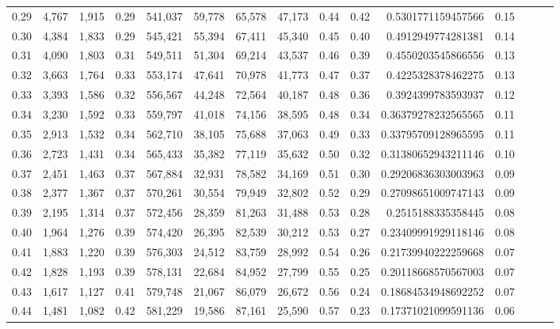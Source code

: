 \begin{tabular}{rrrrrrrrrrrrrrr}
0.29 &   4,767 &  1,915 &  0.29 &  541,037 &   59,778 &   65,578 &   47,173 &  0.44 &  0.42 &      0.5301771159457566 &      0.15 \\
0.30 &   4,384 &  1,833 &  0.29 &  545,421 &   55,394 &   67,411 &   45,340 &  0.45 &  0.40 &      0.4912949774281381 &      0.14 \\
0.31 &   4,090 &  1,803 &  0.31 &  549,511 &   51,304 &   69,214 &   43,537 &  0.46 &  0.39 &      0.4550203545866556 &      0.13 \\
0.32 &   3,663 &  1,764 &  0.33 &  553,174 &   47,641 &   70,978 &   41,773 &  0.47 &  0.37 &      0.4225328378462275 &      0.13 \\
0.33 &   3,393 &  1,586 &  0.32 &  556,567 &   44,248 &   72,564 &   40,187 &  0.48 &  0.36 &      0.3924399783593937 &      0.12 \\
0.34 &   3,230 &  1,592 &  0.33 &  559,797 &   41,018 &   74,156 &   38,595 &  0.48 &  0.34 &     0.36379278232565565 &      0.11 \\
0.35 &   2,913 &  1,532 &  0.34 &  562,710 &   38,105 &   75,688 &   37,063 &  0.49 &  0.33 &     0.33795709128965595 &      0.11 \\
0.36 &   2,723 &  1,431 &  0.34 &  565,433 &   35,382 &   77,119 &   35,632 &  0.50 &  0.32 &     0.31380652943211146 &      0.10 \\
0.37 &   2,451 &  1,463 &  0.37 &  567,884 &   32,931 &   78,582 &   34,169 &  0.51 &  0.30 &     0.29206836303003963 &      0.09 \\
0.38 &   2,377 &  1,367 &  0.37 &  570,261 &   30,554 &   79,949 &   32,802 &  0.52 &  0.29 &     0.27098651009747143 &      0.09 \\
0.39 &   2,195 &  1,314 &  0.37 &  572,456 &   28,359 &   81,263 &   31,488 &  0.53 &  0.28 &      0.2515188335358445 &      0.08 \\
0.40 &   1,964 &  1,276 &  0.39 &  574,420 &   26,395 &   82,539 &   30,212 &  0.53 &  0.27 &     0.23409991929118146 &      0.08 \\
0.41 &   1,883 &  1,220 &  0.39 &  576,303 &   24,512 &   83,759 &   28,992 &  0.54 &  0.26 &     0.21739940222259668 &      0.07 \\
0.42 &   1,828 &  1,193 &  0.39 &  578,131 &   22,684 &   84,952 &   27,799 &  0.55 &  0.25 &     0.20118668570567003 &      0.07 \\
0.43 &   1,617 &  1,127 &  0.41 &  579,748 &   21,067 &   86,079 &   26,672 &  0.56 &  0.24 &     0.18684534948692252 &      0.07 \\
0.44 &   1,481 &  1,082 &  0.42 &  581,229 &   19,586 &   87,161 &   25,590 &  0.57 &  0.23 &     0.17371021099591136 &      0.06 \\

\end{tabular}
